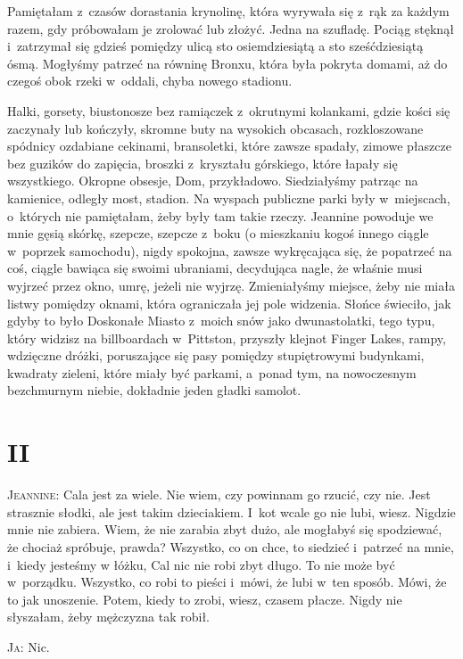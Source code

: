 \documentclass[oneside,polish,12pt,sfheadings]{mwbk}
\begin{document}
Pamiętałam z~czasów dorastania krynolinę, która wyrywała się z~rąk
za każdym razem, gdy próbowałam je zrolować lub złożyć. Jedna na szufladę.
Pociąg stęknął i~zatrzymał się gdzieś pomiędzy ulicą sto osiemdziesiątą
a sto sześćdziesiątą ósmą. Mogłyśmy patrzeć na równinę Bronxu, która
była pokryta domami, aż do czegoś obok rzeki w~oddali, chyba nowego
stadionu.

Halki, gorsety, biustonosze bez ramiączek z~okrutnymi kolankami, gdzie
kości się zaczynały lub kończyły, skromne buty na wysokich obcasach,
rozkloszowane spódnicy ozdabiane cekinami, bransoletki, które zawsze
spadały, zimowe płaszcze bez guzików do zapięcia, broszki z~kryształu
górskiego, które łapały się wszystkiego. Okropne obsesje, Dom, przykładowo.
Siedziałyśmy patrząc na kamienice, odległy most, stadion. Na wyspach
publiczne parki były w~miejscach, o~których nie pamiętałam, żeby były
tam takie rzeczy. Jeannine powoduje we mnie gęsią skórkę, szepcze,
szepcze z~boku (o mieszkaniu kogoś innego ciągle w~poprzek samochodu),
nigdy spokojna, zawsze wykręcająca się, że popatrzeć na coś, ciągle
bawiąca się swoimi ubraniami, decydująca nagle, że właśnie musi wyjrzeć
przez okno, umrę, jeżeli nie wyjrzę. Zmieniałyśmy miejsce, żeby nie
miała listwy pomiędzy oknami, która ograniczała jej pole widzenia.
Słońce świeciło, jak gdyby to było Doskonałe Miasto z~moich snów jako
dwunastolatki, tego typu, który widzisz na billboardach w~Pittston,
przyszły klejnot Finger Lakes, rampy, wdzięczne dróżki, poruszające
się pasy pomiędzy stupiętrowymi budynkami, kwadraty zieleni, które
miały być parkami, a~ponad tym, na nowoczesnym bezchmurnym niebie,
dokładnie jeden gładki samolot.

\chapter{II}

\textsc{Jeannine}: Cala jest za wiele. Nie wiem, czy powinnam go rzucić, czy
nie. Jest strasznie słodki, ale jest takim dzieciakiem. I~kot wcale
go nie lubi, wiesz. Nigdzie mnie nie zabiera. Wiem, że nie zarabia
zbyt dużo, ale mogłabyś się spodziewać, że chociaż spróbuje, prawda?
Wszystko, co on chce, to siedzieć i~patrzeć na mnie, i~kiedy jesteśmy
w łóżku, Cal nic nie robi zbyt długo. To nie może być w~porządku.
Wszystko, co robi to pieści i~mówi, że lubi w~ten sposób. Mówi, że
to jak unoszenie. Potem, kiedy to zrobi, wiesz, czasem płacze. Nigdy
nie słyszałam, żeby mężczyzna tak robił. 

\textsc{Ja}: Nic.
\end{document}
